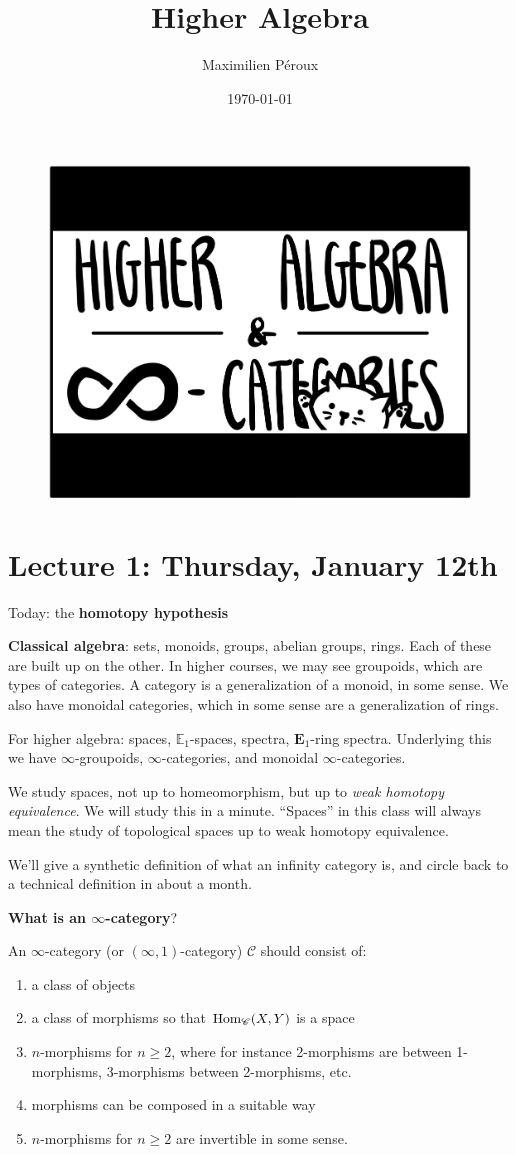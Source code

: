 \documentclass[12pt]{amsart}
\title{Higher Algebra}
\author{Maximilien P\'eroux}
\date{\today}
\theoremstyle{definition}
\begin{document}
\maketitle

\begin{figure}[h]
  \includegraphics[width=0.5\linewidth]{pics/ha.jpg}
  \centering
\end{figure}


\section{Lecture 1: Thursday, January 12th}

Today: the \textbf{homotopy hypothesis}

\textbf{Classical algebra}: sets, monoids, groups, abelian groups, rings. Each of these are built up on the other. In higher courses, we may see groupoids, which are types of categories. A category is a generalization of a monoid, in some sense. We also have monoidal categories, which in some sense are a generalization of rings.

For higher algebra: spaces, $\mathbb{E}_1$-spaces, spectra, $\mathbf{E}_1$-ring spectra. Underlying this we have $\infty$-groupoids, $\infty$-categories, and monoidal $\infty$-categories.

We study spaces, not up to homeomorphism, but up to \textit{weak homotopy equivalence}. We will study this in a minute. ``Spaces'' in this class will always mean the study of topological spaces up to weak homotopy equivalence.

We'll give a synthetic definition of what an infinity category is, and circle back to a technical definition in about a month.

\textbf{What is an $\infty$-category}?

An $\infty$-category (or $(\infty,1)$-category) $\mathscr{C}$ should consist of:
\begin{enumerate}
    \item a class of objects
    \item a class of morphisms so that $\text{Hom}_\mathscr{C}(X,Y)$ is a space
    \item $n$-morphisms for $n \ge 2$, where for instance 2-morphisms are between 1-morphisms, 3-morphisms between 2-morphisms, etc.
    \item morphisms can be composed in a suitable way
    \item $n$-morphisms for $n\ge 2$ are invertible in some sense.
\end{enumerate}
\end{document}
